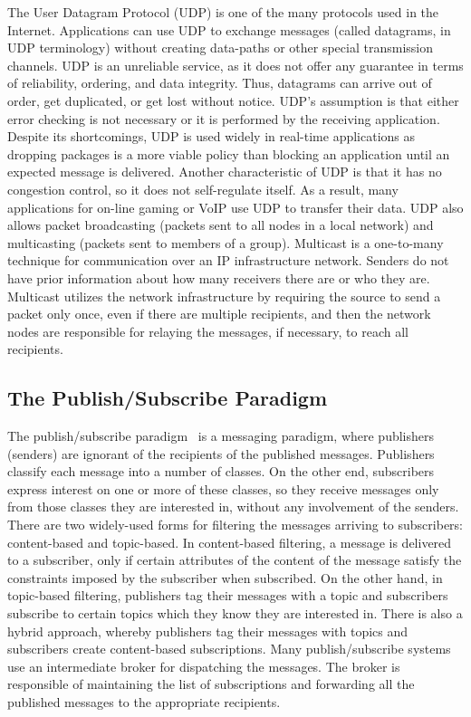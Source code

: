 The User Datagram Protocol (UDP) is one of the many protocols used in the Internet. Applications can use UDP to exchange
messages (called datagrams, in UDP terminology) without  creating data-paths or other
special transmission channels. UDP is an unreliable service, as it does not offer any guarantee in
terms of reliability, ordering, and data integrity. Thus, datagrams can arrive out of order,
get duplicated, or get lost without  notice.  UDP's assumption is that either error checking
is not necessary or it is performed by the receiving application. Despite its shortcomings, UDP is
used widely in real-time applications as dropping packages is a more viable policy than blocking an
application until an expected message is delivered. Another characteristic of UDP is that it has no
congestion control, so it does not self-regulate itself. As a result, many applications for on-line gaming or VoIP use
UDP to transfer their data. UDP also
allows packet broadcasting (packets sent to all nodes in a local network) and multicasting (packets sent to members of a
group). 
Multicast is a one-to-many technique for communication over an IP infrastructure network. Senders
do not have prior information about how many receivers there are or who they are. Multicast utilizes
the network infrastructure by requiring the source to send a packet only once, even if there are
multiple recipients, and then the network nodes are responsible for relaying the messages, if
necessary, to reach all recipients.

\subsection{The Publish/Subscribe Paradigm}
\label{pubsub}

The publish/subscribe paradigm~\cite{pubsub} is a messaging paradigm, where publishers (senders) are ignorant of
the recipients of the published messages. Publishers classify each message into a number of classes. On the
other end, subscribers express interest on one or more of these classes, so they receive messages
only from those classes they are interested in, without any involvement of the senders. There are two widely-used forms
for filtering the
messages arriving to subscribers: content-based and topic-based. In content-based filtering, a
message is delivered to a subscriber, only if certain attributes of the content of the message
satisfy the constraints imposed by the subscriber when subscribed. On the other hand, in topic-based filtering, 
publishers tag their messages with a topic and subscribers subscribe to certain topics which they know they are
interested in. There is also a hybrid approach, whereby publishers tag their messages with topics and
subscribers create content-based subscriptions.
Many publish/subscribe systems use an intermediate broker for dispatching the messages. The broker
is responsible of maintaining the list of subscriptions and forwarding all the published messages to the appropriate
recipients.

